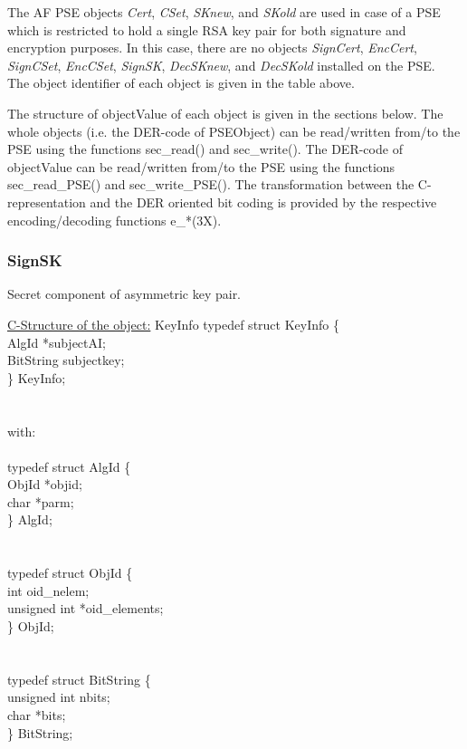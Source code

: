 \ec
The AF PSE objects {\em Cert}, {\em CSet}, {\em SKnew}, and {\em SKold} are used in case
of a PSE which is restricted to hold a single RSA key pair for both signature and encryption purposes.
In this case, there are no objects {\em SignCert}, {\em EncCert}, {\em SignCSet}, {\em EncCSet}, {\em SignSK},
{\em DecSKnew}, and {\em DecSKold} installed on the PSE. \\ [1em]
The object identifier of each object is given in the table above.

The structure of objectValue of each object is given in the sections below.
The whole objects (i.e. the DER-code of PSEObject) can be read/written from/to
the PSE using the functions sec\_read() and sec\_write(). The DER-code
of objectValue can be read/written from/to the PSE using the functions
sec\_read\_PSE() and sec\_write\_PSE().
The transformation between the C-representation and the DER oriented bit coding
is provided by the respective encoding/decoding functions e\_*(3X). 


\subsubsection{SignSK}
Secret component of asymmetric key pair.

\underline{C-Structure of the object:} KeyInfo
{\small
\bvtab
\4      typedef struct KeyInfo \{ \\
\6              AlgId        \3 *subjectAI; \\
\6              BitString    \3 subjectkey; \\
\4      \} KeyInfo; \\ \\ \\
with: \\ \\
\4      typedef struct AlgId \{  \\
\6              ObjId  \3 *objid; \\
\6              char         \3 *parm; \\
\4      \} AlgId; \\ \\ \\
\4      typedef struct ObjId \{  \\
\6              int          \3 oid\_nelem; \\
\6              unsigned int \3 *oid\_elements; \\
\4      \} ObjId;  \\  \\ \\
\4      typedef struct BitString \{  \\
\6              unsigned int \3 nbits; \\
\6              char         \3 *bits; \\
\4      \} BitString;  \\
\evtab
}

